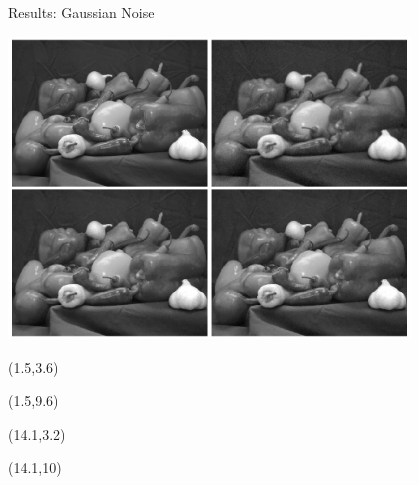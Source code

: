\documentclass[12pt]{beamer}
\begin{document}
\begin{frame}{Results: Gaussian Noise}
\begin{center}
\vspace{-3 mm}
\includegraphics[width = 0.8\textwidth]{../figures/gaussian_peppers.png} 
\end{center}

\begin{textblock}{5}(1.5,3.6)
\end{textblock}

\begin{textblock}{5}(1.5,9.6)
\end{textblock}

\begin{textblock}{5}(14.1,3.2)
\end{textblock}

\begin{textblock}{5}(14.1,10)
\end{textblock}

\end{frame}
\end{document}
